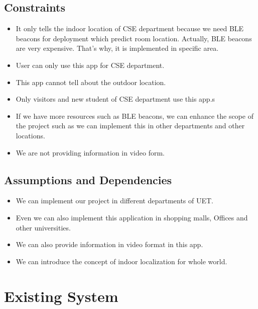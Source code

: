 \documentclass{article}
\begin{document}
\subsection{Constraints}
\begin{itemize}
\item It only tells the indoor location of CSE department because we need BLE beacons for deployment which predict room location. Actually, BLE beacons are very expensive. That’s why, it is implemented in specific area. 
\item User can only use this app for CSE department.
\item This app cannot tell about the outdoor location.
\item Only visitors and new student of CSE department use this app.s
\item If we have more resources such as BLE beacons, we can enhance the scope of the project such as we can implement this in other departments and other locations. 
\item We are not providing information in video form.

\end{itemize}


\subsection{Assumptions and Dependencies}
\begin{itemize}
\item We can implement our project in different departments of UET.
\item Even we can also implement this application in shopping malls, Offices and other universities.
\item We can also provide information in video format in this app.
\item We can introduce the concept of indoor localization for whole world.
\end{itemize}

\section{Existing System}
\end{document}
